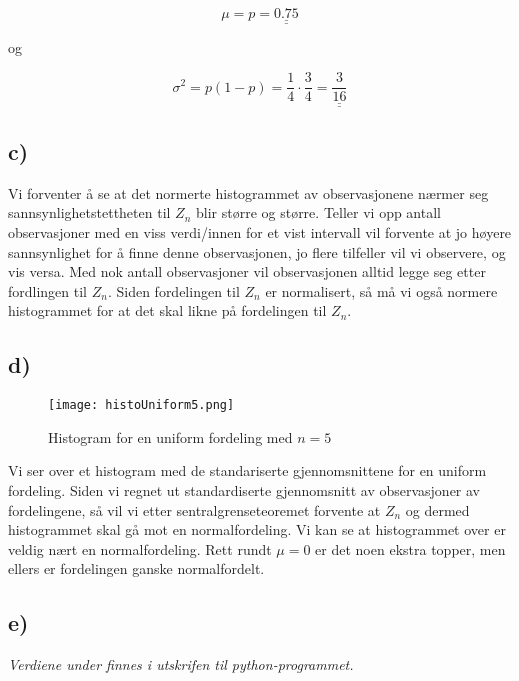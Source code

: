 \documentclass[a4paper,norsk, 10pt]{article}
\begin{document}
\begin{equation}
\mu = p = \underline{\underline{0.75}}
\end{equation}

og

\begin{equation}
\sigma^2 = p(1-p) = \frac{1}{4}\cdot \frac{3}{4} = \underline{\underline{\frac{3}{16}}}
\end{equation}

\subsection*{c)}

Vi forventer å se at det normerte histogrammet av observasjonene nærmer seg sannsynlighetstettheten til $Z_n$ blir større og større. Teller vi opp antall observasjoner med en viss verdi/innen for et vist intervall vil forvente at jo høyere sannsynlighet for å finne denne observasjonen, jo flere tilfeller vil vi observere, og vis versa. Med nok antall observasjoner vil observasjonen alltid legge seg etter fordlingen til $Z_n$. Siden fordelingen til $Z_n$ er normalisert, så må vi også normere histogrammet for at det skal likne på fordelingen til $Z_n$.

\subsection*{d)}


\begin{figure}[H]
\centering
\texttt{[image: histoUniform5.png]}
\caption{Histogram for en uniform fordeling med $n = 5$}
\label{fig:histoUniform5}
\end{figure}


Vi ser over et histogram med de standariserte gjennomsnittene for en uniform fordeling. Siden vi regnet ut standardiserte gjennomsnitt av observasjoner av fordelingene, så vil vi etter sentralgrenseteoremet forvente at $Z_n$ og dermed histogrammet skal gå mot en normalfordeling. Vi kan se at histogrammet over er veldig nært en normalfordeling. Rett rundt $\mu = 0$ er det noen ekstra topper, men ellers er fordelingen ganske normalfordelt. 

\subsection*{e)}

\textit{Verdiene under finnes i utskrifen til python-programmet.}
\end{document}
